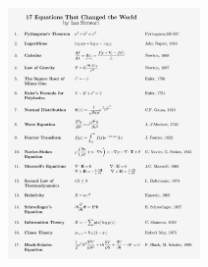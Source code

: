 {{\begin{minipage}{0.49\textwidth}
\begin{figure}[h!]
\centering
%
\vspace{-15.5pt}
\includegraphics[height=2.85in,width=2.00in,viewport=0 0 780 1100,clip]{Figures/Great_Equation.jpg}
\label{Great_Equation}
\end{figure}
\end{minipage}
}

}
